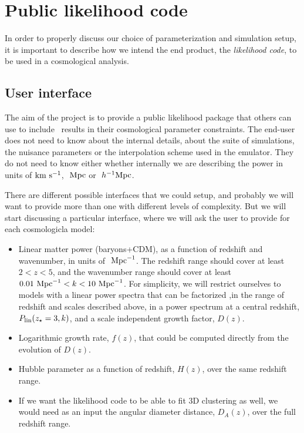 \section{Public likelihood code}

In order to properly discuss our choice of parameterization and simulation
setup, it is important to describe how we intend the end product,
the \textit{likelihood code}, to be used in a cosmological analysis.


\subsection{User interface}

The aim of the project is to provide a public likelihood package that others
can use to include \lya\ results in their cosmological parameter constraints.
The end-user does not need to know about the internal details, about the 
suite of simulations, the nuisance parameters or the interpolation scheme 
used in the emulator.
They do not need to know either whether internally we are describing the 
power in units of ${\rm km~s^{-1}}$, $\ \text{Mpc}$ or $\ h^{-1}\text{Mpc}$. 

There are different possible interfaces that we could setup, and probably 
we will want to provide more than one with different levels of complexity.
But we will start discussing a particular interface, where we will ask 
the user to provide for each cosmologicla model:
\begin{itemize}
 \item Linear matter power (baryons+CDM), as a function of redshift and 
  wavenumber, in units of $\ \text{Mpc}^{-1}$. 
  The redshift range should cover at least $2 < z < 5$, and the wavenumber
  range should cover at least $0.01 \ \text{Mpc}^{-1} < k < 10 \ \text{Mpc}^{-1}$. 
  For simplicity, we will restrict ourselves to models with a linear power 
  spectra that can be factorized ,in the range of redshift and scales 
  described above, in a power spectrum at a central redshift, 
  $P_{\rm lin}(z_\star=3,k)$, and a scale independent growth factor, $D(z)$.
 \item Logarithmic growth rate, $f(z)$, that could be computed directly
  from the evolution of $D(z)$.
 \item Hubble parameter as a function of redshift, $H(z)$, over the same 
  redshift range.
 \item If we want the likelihood code to be able to fit 3D clustering as well,
  we would need as an input the angular diameter distance, $D_A(z)$, 
  over the full redshift range.
\end{itemize}

